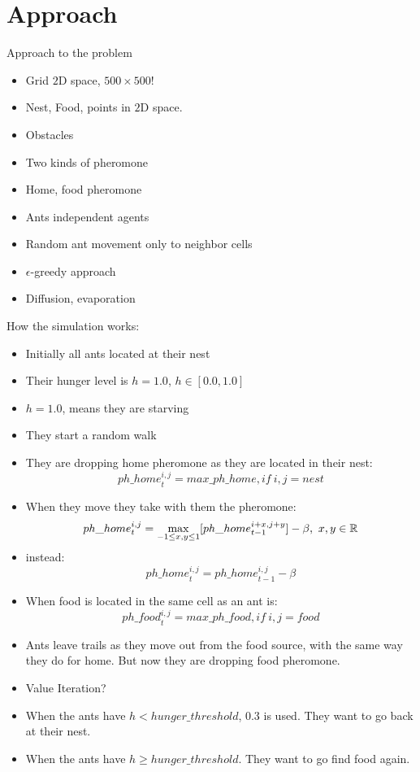 \documentclass{beamer}
\begin{document}
\section{Approach}
\begin{frame}
Approach to the problem
\begin{itemize}
\item Grid $2$D space, $500 \times 500 !$
\item Nest, Food, points in $2$D space.
\item Obstacles
\item Two kinds of pheromone
\item Home, food pheromone
\item Ants independent agents
\item Random ant movement only to neighbor cells
\item $\epsilon$-greedy approach
\item Diffusion, evaporation
\end{itemize}
\end{frame}

\begin{frame}[allowframebreaks]
How the simulation works:
\begin{itemize}
\item Initially all ants located at their nest
\item Their hunger level is $h = 1.0$, $h \in [0.0,1.0]$
\item $h = 1.0$, means they are starving
\item They start a random walk
\item They are dropping home pheromone as they are located in their nest:
\begin{equation}
{ph\_{home}}_t^{i,j} = max\_ph\_home, if\ i,j = nest
\end{equation}
\item When they move they take with them the pheromone:
\begin{equation}
{ph\_{home}}_t^{i,j} = \smash{\displaystyle\max_{-1 \leq x,y \leq 1}}[{ph\_{home}}_{t-1}^{i+x,j+y}] - \beta,\ x,y \in \mathbb{R}
\end{equation}
\item instead:
\begin{equation}
{ph\_{home}}_t^{i,j} = {ph\_{home}}_{t-1}^{i,j} - \beta
\end{equation}
\item When food is located in the same cell as an ant is:
\begin{equation}
{ph\_{food}}_t^{i,j} = max\_ph\_food, if\ i,j = food
\end{equation}
\item Ants leave trails as they move out from the food source, with the same way they do for home. But now they are dropping food pheromone.
\item Value Iteration?
\item When the ants have $h < hunger\_threshold$, $0.3$ is used. They want to go back at their nest.
\item When the ants have $h \geq hunger\_threshold$. They want to go find food again.
\end{itemize}
\end{frame}
\end{document}
